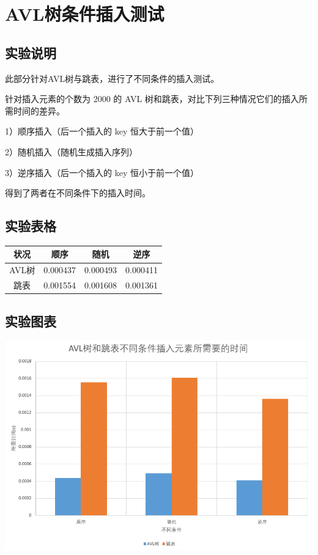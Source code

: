 \documentclass[UTF8]{ctexart}
\begin{document}
\section{AVL树条件插入测试}
\subsection{实验说明}
此部分针对AVL树与跳表，进行了不同条件的插入测试。

针对插入元素的个数为 2000 的 AVL 树和跳表，对比下列三种情况它们的插入所需时间的差异。

1）顺序插入（后一个插入的 key 恒大于前一个值）

2）随机插入（随机生成插入序列）

3）逆序插入（后一个插入的 key 恒小于前一个值）

得到了两者在不同条件下的插入时间。
\subsection{实验表格}
\begin{center}
    \begin{tabular}{|c|c|c|c|}
        \hline
        状况&	顺序&	随机&	逆序\\
        \hline
        AVL树&	0.000437&	0.000493&	0.000411\\
        \hline
        跳表&	0.001554&	0.001608&	0.001361\\
        \hline
    \end{tabular}
\end{center}
\subsection{实验图表}
\begin{center}
    \includegraphics[scale=0.5]{Conditioninsert.png}
\end{center}
\end{document}
